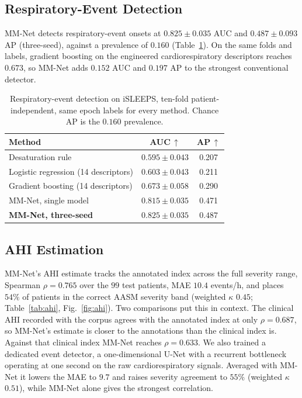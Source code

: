 \documentclass{ieeeaccess}
\newcommand{\mmAuc}{0.825}
\newcommand{\mmAp}{0.487}
\newcommand{\mmRho}{0.765}
\begin{document}
\subsection{Respiratory-Event Detection}
MM-Net detects respiratory-event onsets at $\mmAuc\pm0.035$ AUC and $\mmAp\pm0.093$ AP
(three-seed), against a prevalence of $0.160$ (Table~\ref{tab:resp}). On the same folds and
labels, gradient boosting on the engineered cardiorespiratory descriptors reaches $0.673$, so
MM-Net adds $0.152$ AUC and $0.197$ AP to the strongest conventional detector.

\begin{table}[t]
\caption{Respiratory-event detection on iSLEEPS, ten-fold patient-independent, same epoch
labels for every method. Chance AP is the $0.160$ prevalence.}
\label{tab:resp}
\centering
\small
\begin{tabular}{lcc}
\toprule
Method & AUC\,$\uparrow$ & AP\,$\uparrow$ \\
\midrule
Desaturation rule & $0.595 \pm 0.043$ & 0.207 \\
Logistic regression (14 descriptors) & $0.603 \pm 0.043$ & 0.211 \\
Gradient boosting (14 descriptors) & $0.673 \pm 0.058$ & 0.290 \\
MM-Net, single model & $0.815 \pm 0.035$ & 0.471 \\
\textbf{MM-Net, three-seed} & $\mathbf{0.825 \pm 0.035}$ & $\mathbf{0.487}$ \\
\bottomrule
\end{tabular}
\end{table}

\subsection{AHI Estimation}
\label{sec:ahi}
MM-Net's AHI estimate tracks the annotated index across the full severity range,
Spearman $\rho=\mmRho$ over the $99$ test patients, MAE $10.4$ events/h, and places $54\%$ of
patients in the correct AASM severity band (weighted $\kappa$ $0.45$; Table~\ref{tab:ahi},
Fig.~\ref{fig:ahi}). Two comparisons put this in context. The clinical AHI recorded with the
corpus agrees with the annotated index at only $\rho=0.687$, so MM-Net's estimate is closer to
the annotations than the clinical index is. Against that clinical index MM-Net reaches
$\rho=0.633$. We also trained a
dedicated event detector, a one-dimensional U-Net with a recurrent bottleneck operating at one
second on the raw cardiorespiratory signals. Averaged with MM-Net it lowers the MAE to $9.7$ and
raises severity agreement to $55\%$ (weighted $\kappa$ $0.51$), while MM-Net alone gives the
strongest correlation.
\end{document}
